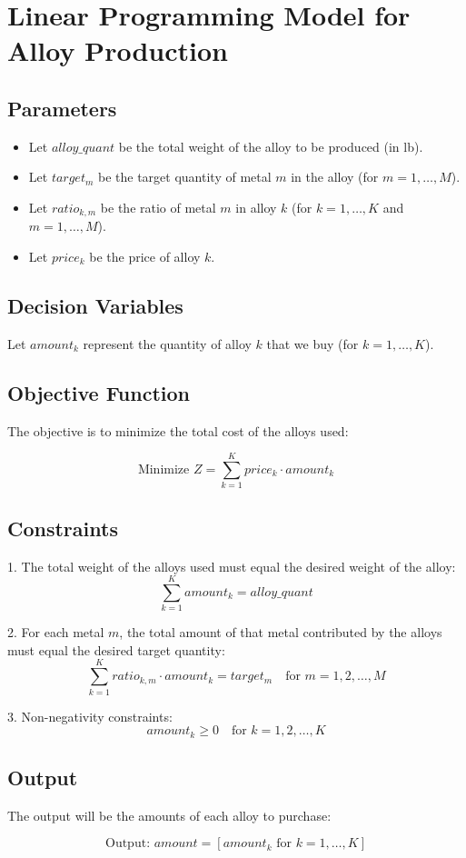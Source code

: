 \documentclass{article}
\begin{document}
\section*{Linear Programming Model for Alloy Production}

\subsection*{Parameters}

\begin{itemize}
    \item Let \( alloy\_quant \) be the total weight of the alloy to be produced (in lb).
    \item Let \( target_m \) be the target quantity of metal \( m \) in the alloy (for \( m=1, \ldots, M \)).
    \item Let \( ratio_{k, m} \) be the ratio of metal \( m \) in alloy \( k \) (for \( k=1, \ldots, K \) and \( m=1, \ldots, M \)).
    \item Let \( price_k \) be the price of alloy \( k \).
\end{itemize}

\subsection*{Decision Variables}

Let \( amount_k \) represent the quantity of alloy \( k \) that we buy (for \( k=1, \ldots, K \)).

\subsection*{Objective Function}

The objective is to minimize the total cost of the alloys used:

\[
\text{Minimize } Z = \sum_{k=1}^{K} price_k \cdot amount_k
\]

\subsection*{Constraints}

1. The total weight of the alloys used must equal the desired weight of the alloy:
\[
\sum_{k=1}^{K} amount_k = alloy\_quant
\]

2. For each metal \( m \), the total amount of that metal contributed by the alloys must equal the desired target quantity:
\[
\sum_{k=1}^{K} ratio_{k, m} \cdot amount_k = target_m \quad \text{for } m = 1, 2, \ldots, M
\]

3. Non-negativity constraints:
\[
amount_k \geq 0 \quad \text{for } k = 1, 2, \ldots, K
\]

\subsection*{Output}

The output will be the amounts of each alloy to purchase:

\[
\text{Output: } amount = [amount_k \text{ for } k = 1, \ldots, K]
\]
\end{document}
